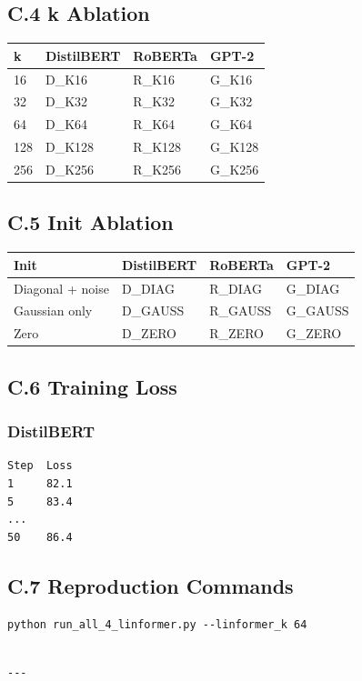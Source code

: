 \subsection{C.4 k Ablation}

\begin{table}[H]
\centering
\small
\begin{tabular}{llll}
\toprule
\textbf{k} & \textbf{DistilBERT} & \textbf{RoBERTa} & \textbf{GPT-2} \\
\midrule
16 & {{D\_K16}} & {{R\_K16}} & {{G\_K16}} \\
32 & {{D\_K32}} & {{R\_K32}} & {{G\_K32}} \\
64 & {{D\_K64}} & {{R\_K64}} & {{G\_K64}} \\
128 & {{D\_K128}} & {{R\_K128}} & {{G\_K128}} \\
256 & {{D\_K256}} & {{R\_K256}} & {{G\_K256}} \\
\bottomrule
\end{tabular}
\end{table}

\subsection{C.5 Init Ablation}

\begin{table}[H]
\centering
\small
\begin{tabular}{llll}
\toprule
\textbf{Init} & \textbf{DistilBERT} & \textbf{RoBERTa} & \textbf{GPT-2} \\
\midrule
Diagonal + noise & {{D\_DIAG}} & {{R\_DIAG}} & {{G\_DIAG}} \\
Gaussian only & {{D\_GAUSS}} & {{R\_GAUSS}} & {{G\_GAUSS}} \\
Zero & {{D\_ZERO}} & {{R\_ZERO}} & {{G\_ZERO}} \\
\bottomrule
\end{tabular}
\end{table}

\subsection{C.6 Training Loss}

\subsubsection{DistilBERT}
\begin{lstlisting}
Step  Loss
1     82.1
5     83.4
...
50    86.4
\end{lstlisting}

\subsection{C.7 Reproduction Commands}

\begin{lstlisting}
python run_all_4_linformer.py --linformer_k 64
\end{lstlisting}
\begin{lstlisting}

---
\end{lstlisting}